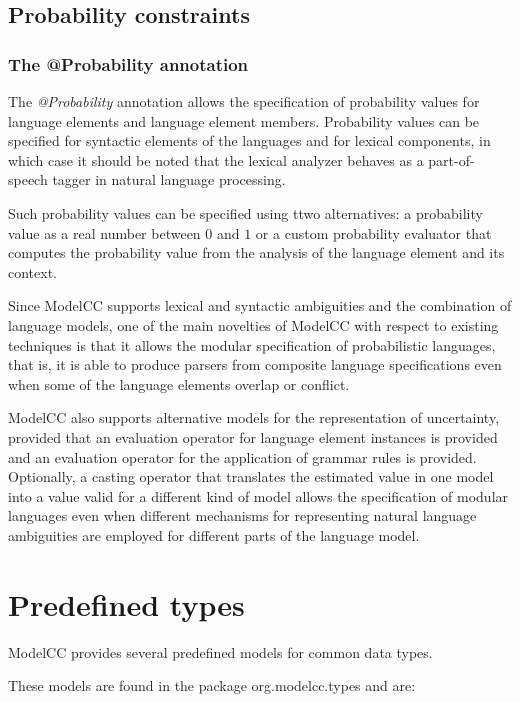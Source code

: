 \documentclass[a4paper,twoside,onecolumn]{article}
\begin{document}
\subsection{Probability constraints}

\subsubsection{The @Probability annotation}

The \emph{@Probability} annotation allows the specification of probability values for language elements and language element members. Probability values can be specified for syntactic elements of the languages and for lexical components, in which case it should be noted that the lexical analyzer behaves as a part-of-speech tagger in natural language processing.

Such probability values can be specified using ttwo alternatives: a probability value as a real number between $0$ and $1$ or a custom probability evaluator that computes the probability value from the analysis of the language element and its context.

Since ModelCC supports lexical and syntactic ambiguities and the combination of language models, one of the main novelties of ModelCC with respect to existing techniques is that it allows the modular specification of probabilistic languages, that is, it is able to produce parsers from composite language specifications even when some of the language elements overlap or conflict.

ModelCC also supports alternative models for the representation of uncertainty, provided that an evaluation operator for language element instances is provided and an evaluation operator for the application of grammar rules is provided.
Optionally, a casting operator that translates the estimated value in one model into a value valid for a different kind of model allows the specification of modular languages even when different mechanisms for representing natural language ambiguities are employed for different parts of the language model.

\section{Predefined types} \label{sec:predefinedtypes}

ModelCC provides several predefined models for common data types.

These models are found in the package org.modelcc.types and are:
\end{document}
